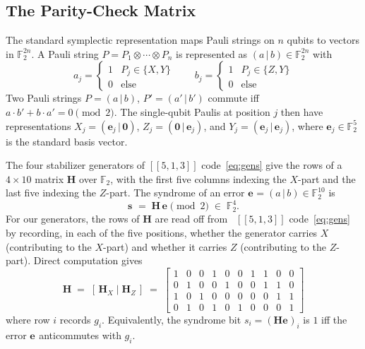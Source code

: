 \documentclass[11pt,a4paper]{article}
\theoremstyle{definition}
\newcommand{\Hm}{\mathbf{H}}
\newcommand{\sk}[1][]{\mathbf{s}_{#1}}
\newcommand{\ek}[1][]{\mathbf{e}_{#1}}
\newcommand{\Fbb}{\mathbb{F}}
\begin{document}
\subsection{The Parity-Check Matrix}
\label{sec:513_pc}

The standard symplectic representation maps Pauli strings on $n$ qubits to vectors in $\Fbb_2^{2n}$. A Pauli string $P = P_1\otimes\cdots\otimes P_n$ is represented as $(a\,|\,b)\in
\Fbb_2^{2n}$ with
\[
  a_j = \begin{cases}1 & P_j\in\{X,Y\}\\ 0 & \text{else}\end{cases}
  \qquad
  b_j = \begin{cases}1 & P_j\in\{Z,Y\}\\ 0 & \text{else}\end{cases}
\]
Two Pauli strings $P=(a\,|\,b)$, $P'=(a'\,|\,b')$ commute iff $a\cdot b' + b\cdot a' = 0\pmod 2$. The single-qubit Paulis at position $j$ then have representations $X_j=(\ek[j]\,|\,\mathbf{0})$, $Z_j=(\mathbf{0}\,|\,\ek[j])$, and $Y_j=(\ek[j]\,|\,\ek[j])$, where $\ek[j]\in\Fbb_2^5$ is the standard basis vector.

The four stabilizer generators of $[[5,1,3]]$ code~\eqref{eq:gens} give the rows of a $4\times 10$ matrix $\Hm$ over $\Fbb_2$, with the first five columns indexing the $X$-part and the last five indexing the $Z$-part. The syndrome of an error $\ek=(a\,|\,b)\in\Fbb_2^{10}$ is
\begin{equation}
  \sk \;=\; \Hm\,\ek \pmod 2 \;\in\; \Fbb_2^4 .
  \label{eq:hsyndrome}
\end{equation}
For our generators, the rows of $\Hm$ are read off from~ $[[5,1,3]]$ code~\eqref{eq:gens} by recording, in each of the five positions, whether the generator carries $X$ (contributing to the $X$-part) and whether it carries $Z$ (contributing to the $Z$-part). Direct computation gives
\begin{equation}
  \Hm \;=\; \left[\,\Hm_X\;\Big|\;\Hm_Z\,\right] \;=\;
  \left[\begin{array}{ccccc|ccccc}
    1 & 0 & 0 & 1 & 0 & 0 & 1 & 1 & 0 & 0 \\
    0 & 1 & 0 & 0 & 1 & 0 & 0 & 1 & 1 & 0 \\
    1 & 0 & 1 & 0 & 0 & 0 & 0 & 0 & 1 & 1 \\
    0 & 1 & 0 & 1 & 0 & 1 & 0 & 0 & 0 & 1
  \end{array}\right]
  \label{eq:hmatrix}
\end{equation}
where row $i$ records $g_i$. Equivalently, the syndrome bit $s_i = (\Hm\ek)_i$ is $1$ iff the error $\ek$ anticommutes with $g_i$.
\end{document}
